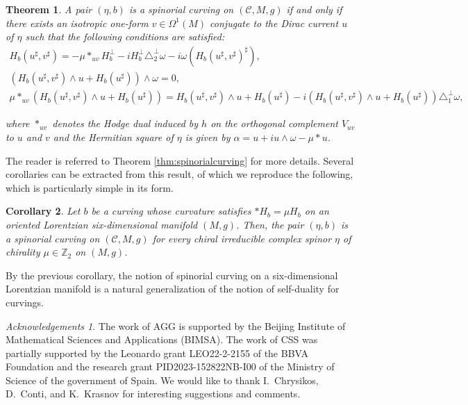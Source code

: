 \documentclass[10pt,a4paper,twoside,reqno]{amsart}
\theoremstyle{plain}
\newtheorem{thm}{Theorem}[section]
\newtheorem{cor}[thm]{Corollary}
\theoremstyle{definition}
\theoremstyle{remark}
\newtheorem*{ack}{Acknowledgements}
\def\cC{{\mathcal C}}
\def\cC{\mathcal{C}}
\begin{document}
\begin{thm}
A pair $(\eta,b)$ is a spinorial curving on $(\cC,M,g)$ if and only if there exists an isotropic one-form $v\in \Omega^1(M)$ conjugate to the Dirac current $u$ of $\eta$ such that the following conditions are satisfied:
\begin{gather*}
H_b(u^{\sharp},v^{\sharp}) = -\mu \ast_{uv} H_b^\perp - iH_b^\perp\triangle_2^\perp\omega - i\omega(H_b(u^{\sharp},v^{\sharp})^\sharp),\\
(H_b(u^\sharp,v^\sharp)\wedge u+H_b(u^\sharp))\wedge\omega=0,\\
\mu \ast_{uv} (H_b(u^\sharp,v^\sharp)\wedge u+H_b(u^\sharp)) = H_b(u^\sharp,v^\sharp)\wedge u+H_b(u^\sharp) - i (H_b(u^\sharp,v^\sharp)\wedge u+H_b(u^\sharp)) \triangle^{\perp}_1 \omega,
\end{gather*}

\noindent
where $\ast_{uv}$ denotes the Hodge dual induced by $h$ on the orthogonal complement $V_{uv}$ to $u$ and $v$ and the Hermitian square of $\eta$ is given by $\widehat{\alpha} = u + i u\wedge \omega - \mu \ast u$. 
\end{thm}

\noindent
The reader is referred to Theorem \ref{thm:spinorialcurving} for more details. Several corollaries can be extracted from this result, of which we reproduce the following, which is particularly simple in its form.

\begin{cor}
Let $b$ be a curving whose curvature satisfies $\ast H_b = \mu H_b$ on an oriented Lorentzian six-dimensional manifold $(M,g)$. Then, the pair $(\eta,b)$ is a spinorial curving on $(\cC,M,g)$ for every chiral irreducible complex spinor $\eta$ of chirality $\mu\in \mathbb{Z}_2$ on $(M,g)$.
\end{cor}

\noindent
By the previous corollary, the notion of spinorial curving on a six-dimensional Lorentzian manifold is a natural generalization of the notion of self-duality for curvings.

\begin{ack}
The work of AGG is supported by the Beijing Institute of Mathematical Sciences and Applications (BIMSA). The work of CSS was partially supported by the Leonardo grant LEO22-2-2155 of the BBVA Foundation and the research grant PID2023-152822NB-I00 of the Ministry of Science of the government of Spain. We would like to thank I.\ Chrysikos, D.\ Conti, and K.\ Krasnov for interesting suggestions and comments. 
\end{ack}
\end{document}
